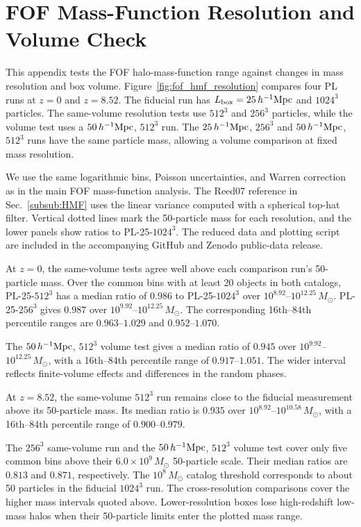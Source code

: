 \documentclass[
 reprint,
 superscriptaddress,
 nofootinbib,
 nobibnotes,
 amsmath,
 amssymb,
 aps,
 prd,
 floatfix,
 longbibliography
]{revtex4-2}
\DeclareRobustCommand{\change}[1]{#1}
\begin{document}
\section{FOF Mass-Function Resolution and Volume Check}
\label{app:fof_hmf_resolution}

This appendix tests the FOF halo-mass-function range against changes in mass resolution and box volume. Figure~\ref{fig:fof_hmf_resolution} compares four PL runs at \(z=0\) and \(z=8.52\). The fiducial run has \(L_{\rm box}=25\,h^{-1}{\rm Mpc}\) and \(1024^3\) particles. The same-volume resolution tests use \(512^3\) and \(256^3\) particles, while the volume test uses a \(50\,h^{-1}{\rm Mpc}\), \(512^3\) run. The \(25\,h^{-1}{\rm Mpc}\), \(256^3\) and \(50\,h^{-1}{\rm Mpc}\), \(512^3\) runs have the same particle mass, allowing a volume comparison at fixed mass resolution.

We use the same logarithmic bins, Poisson uncertainties, and Warren correction as in the main FOF mass-function analysis. \change{The Reed07 reference in Sec.~\ref{subsub:HMF} uses the linear variance computed with a spherical top-hat filter.} Vertical dotted lines mark the 50-particle mass for each resolution, and the lower panels show ratios to PL-25-\(1024^3\). The reduced data and plotting script are included in the accompanying GitHub and Zenodo public-data release.

At \(z=0\), the same-volume tests agree well above each comparison run's 50-particle mass. Over the common bins with at least 20 objects in both catalogs, PL-25-\(512^3\) has a median ratio of \(0.986\) to PL-25-\(1024^3\) over \(10^{8.92}\)--\(10^{12.25}\,M_\odot\). PL-25-\(256^3\) gives \(0.987\) over \(10^{9.92}\)--\(10^{12.25}\,M_\odot\). The corresponding 16th--84th percentile ranges are \(0.963\)--\(1.029\) and \(0.952\)--\(1.070\).

The \(50\,h^{-1}{\rm Mpc}\), \(512^3\) volume test gives a median ratio of \(0.945\) over \(10^{9.92}\)--\(10^{12.25}\,M_\odot\), with a 16th--84th percentile range of \(0.917\)--\(1.051\). The wider interval reflects finite-volume effects and differences in the random phases.

At \(z=8.52\), the same-volume \(512^3\) run remains close to the fiducial measurement above its 50-particle mass. Its median ratio is \(0.935\) over \(10^{8.92}\)--\(10^{10.58}\,M_\odot\), with a 16th--84th percentile range of \(0.900\)--\(0.979\).

The \(256^3\) same-volume run and the \(50\,h^{-1}{\rm Mpc}\), \(512^3\) volume test cover only five common bins above their \(6.0\times10^9\,M_\odot\) 50-particle scale. Their median ratios are \(0.813\) and \(0.871\), respectively. The \(10^8\,M_\odot\) catalog threshold corresponds to about 50 particles in the fiducial \(1024^3\) run. The cross-resolution comparisons cover the higher mass intervals quoted above. Lower-resolution boxes lose high-redshift low-mass halos when their 50-particle limits enter the plotted mass range.
\end{document}
